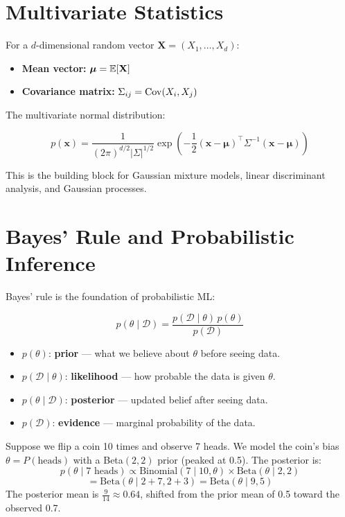 \section{Multivariate Statistics}

For a $d$-dimensional random vector $\mathbf{X} = (X_1, \dots, X_d)$:

\begin{itemize}
	\item \textbf{Mean vector:} $\boldsymbol{\mu} = \mathbb{E}[\mathbf{X}]$
	\item \textbf{Covariance matrix:} $\Sigma_{ij} = \operatorname{Cov}(X_i, X_j)$
\end{itemize}

The multivariate normal distribution:

\[
	p(\mathbf{x}) = \frac{1}{(2\pi)^{d/2} |\Sigma|^{1/2}} \exp\left(-\frac12 (\mathbf{x} - \boldsymbol{\mu})^\top \Sigma^{-1} (\mathbf{x} - \boldsymbol{\mu})\right)
\]

This is the building block for Gaussian mixture models, linear discriminant analysis, and Gaussian processes.

\section{Bayes' Rule and Probabilistic Inference}

Bayes' rule is the foundation of probabilistic ML:

\[
	p(\theta \mid \mathcal{D}) = \frac{p(\mathcal{D} \mid \theta) \, p(\theta)}{p(\mathcal{D})}
\]

\begin{itemize}
	\item $p(\theta)$: \textbf{prior} --- what we believe about $\theta$ before seeing data.
	\item $p(\mathcal{D} \mid \theta)$: \textbf{likelihood} --- how probable the data is given $\theta$.
	\item $p(\theta \mid \mathcal{D})$: \textbf{posterior} --- updated belief after seeing data.
	\item $p(\mathcal{D})$: \textbf{evidence} --- marginal probability of the data.
\end{itemize}

\begin{example}
	Suppose we flip a coin 10 times and observe 7 heads. We model the coin's bias $\theta = P(\text{heads})$ with a Beta$(2,2)$ prior (peaked at 0.5). The posterior is:
	\[
		p(\theta \mid \text{7 heads}) \propto \text{Binomial}(7 \mid 10, \theta) \times \text{Beta}(\theta \mid 2, 2)
	\]
	\[
		= \text{Beta}(\theta \mid 2 + 7, 2 + 3) = \text{Beta}(\theta \mid 9, 5)
	\]
	The posterior mean is $\frac{9}{14} \approx 0.64$, shifted from the prior mean of 0.5 toward the observed 0.7.
\end{example}

